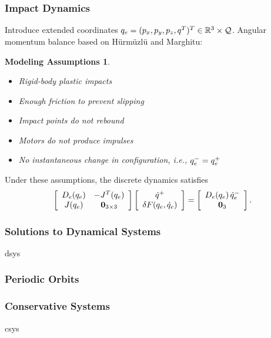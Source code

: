 \documentclass{beamer}
\newtheorem{massump}{Modeling Assumptions}
\begin{document}
\begin{frame}
\begin{columns}[t]
\begin{column}{.45\textwidth}
\begin{figure}
      \end{figure}
    \end{column}
  \end{columns}
\end{frame}

\begin{frame}
  \frametitle{Impact Dynamics}
  Introduce extended coordinates $q_{e} = (p_{x}, p_{y}, p_{z}, q^{T})^{T} \in \mathbb{R}^{3} \times \mathcal{Q}$. Angular momentum balance based on H{\"u}rm{\"u}zl{\"u} and Marghitu:
  \begin{massump}
    \begin{itemize}
    \item Rigid-body plastic impacts
    \item Enough friction to prevent slipping
    \item Impact points do not rebound
    \item Motors do not produce impulses
    \item No instantaneous change in configuration, i.e., $q_{e}^{-} = q_{e}^{+}$
    \end{itemize}
  \end{massump}
  Under these assumptions, the discrete dynamics satisfies
  \begin{align*}
    \left[\begin{array}{c c}
        D_{e}(q_{e}) & -J^{T}(q_{e})\\
        J(q_{e}) & \mathbf{0}_{3 \times 3}
      \end{array}\right]
    \left[\begin{array}{c}
        \dot q^{+}\\
        \delta F(q_{e}, \dot q_{e})
      \end{array}\right]
    = \left[\begin{array}{c c}
        D_{e}(q_{e}) \, \dot q_{e}^{-}\\
        \mathbf{0}_{3}
      \end{array}\right].
  \end{align*}
\end{frame}

\begin{frame}
  \frametitle{Solutions to Dynamical Systems}
  dsys
\end{frame}

\begin{frame}
  \frametitle{Periodic Orbits}
\end{frame}

\begin{frame}
  \frametitle{Conservative Systems}
  csys
\end{frame}
\end{document}
